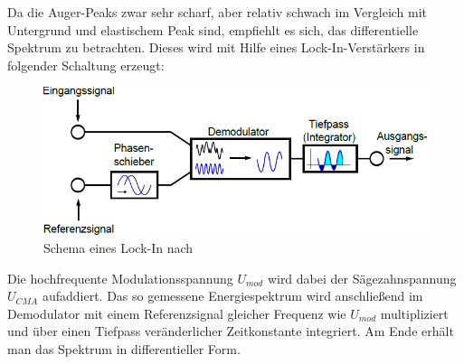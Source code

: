 	Da die Auger-Peaks zwar sehr scharf, aber relativ schwach im Vergleich mit Untergrund und elastischem Peak sind, empfiehlt es sich, das differentielle Spektrum zu betrachten. 
	Dieses wird mit Hilfe eines Lock-In-Verstärkers in folgender Schaltung erzeugt:

	\begin{figure}[H]
		\center
		\includegraphics[scale=0.55]{lockin.png}
		\caption{Schema eines Lock-In nach \cite{description}}
	\end{figure}

	Die hochfrequente Modulationsspannung $U_{mod}$ wird dabei der Sägezahnspannung $U_{CMA}$ aufaddiert. 
	Das so gemessene Energiespektrum wird anschließend im Demodulator mit einem Referenzsignal gleicher Frequenz wie $U_{mod}$ multipliziert und über einen Tiefpass veränderlicher Zeitkonstante integriert. 
	Am Ende erhält man das Spektrum in differentieller Form.

